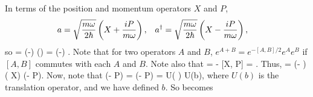 \begin{solution}
	In terms of the position and momentum operators $X$ and $P$,
	\begin{align*}
		a &= \sqrt{\frac{m\omega}{2\hbar}} \left( X + \frac{iP}{m\omega} \right), &
		a^\dagger &= \sqrt{\frac{m\omega}{2\hbar}} \left( X - \frac{iP}{m\omega} \right),
	\end{align*}
	so
	\beqn \label{ugh}
		\bkxlam = \exp(-) \bx \exp(\lam \ad) \ko = \exp(-) \bx {} \ko.
	\eeqn
	Note that for two operators $A$ and $B$, $e^{A + B} = e^{-[A, B] / 2} e^A e^B$ if $[A, B]$ commutes with each $A$ and $B$.  Note also that
	\beq
		 = - [X, P] = .	
	\eeq
	Thus,
	\beq
		 = \exp(-\lam {} ) \exp(\lam {} X) \exp(-\lam {}  P).
	\eeq
	Now, note that
	\beqn \label{defb}
		\exp(-\lam {}  P) = \exp(- \lam {}  P) = U\!\left( \lam {} \right) \equiv U(b),
	\eeqn
	where $U(b)$ is the translation operator, and we have defined $b$.  So  becomes

\end{solution}
